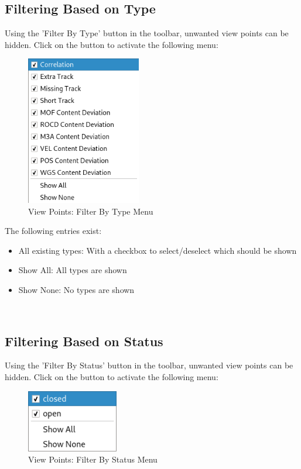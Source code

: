 \subsection{Filtering Based on Type}

Using the 'Filter By Type' button in the toolbar, unwanted view points can be hidden. Click on the button to activate the following menu:

\begin{figure}[H]
  \centering 
    \includegraphics[width=5cm,frame]{figures/view_points_filter_type.png}
  \caption{View Points: Filter By Type Menu}
\end{figure}

The following entries exist:

\begin{itemize}  
\item All existing types: With a checkbox to select/deselect which should be shown
\item Show All: All types are shown
\item Show None: No types are shown
\end{itemize}
\ \\

\subsection{Filtering Based on Status}

Using the 'Filter By Status' button in the toolbar, unwanted view points can be hidden. Click on the button to activate the following menu:

\begin{figure}[H]
  \centering 
    \includegraphics[width=4cm,frame]{figures/view_points_filter_status.png}
  \caption{View Points: Filter By Status Menu}
\end{figure}

